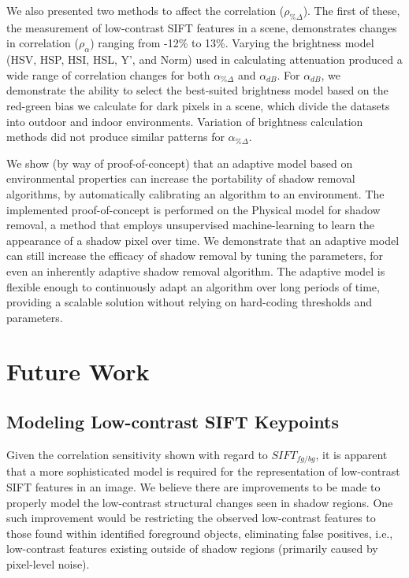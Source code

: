 We also presented two methods to affect the correlation ($\rho_{\%\Delta}$). The first of these, the measurement of low-contrast SIFT features in a scene, demonstrates changes in correlation ($\rho_{\alpha}$) ranging from -12\% to 13\%. Varying the brightness model (HSV, HSP, HSI, HSL, Y', and Norm) used in calculating attenuation produced a wide range of correlation changes for both $\alpha_{\%\Delta}$ and $\alpha_{dB}$. For $\alpha_{dB}$, we demonstrate the ability to select the best-suited brightness model based on the red-green bias we calculate for dark pixels in a scene, which divide the datasets into outdoor and indoor environments. Variation of brightness calculation methods did not produce similar patterns for $\alpha_{\%\Delta}$.

We show (by way of proof-of-concept) that an adaptive model based on environmental properties can increase the portability of shadow removal algorithms, by automatically calibrating an algorithm to an environment. The implemented proof-of-concept is performed on the Physical model for shadow removal, a method that employs unsupervised machine-learning to learn the appearance of a shadow pixel over time. We demonstrate that an adaptive model can still increase the efficacy of shadow removal by tuning the parameters, for even an inherently adaptive shadow removal algorithm. The adaptive model is flexible enough to continuously adapt an algorithm over long periods of time, providing a scalable solution without relying on hard-coding thresholds and parameters. 

\section{Future Work} \label{section:futurework}

\subsection{Modeling Low-contrast SIFT Keypoints}

Given the correlation sensitivity shown with regard to $SIFT_{fg/bg}$, it is apparent that a more sophisticated model is required for the representation of low-contrast SIFT features in an image. We believe there are improvements to be made to properly model the low-contrast structural changes seen in shadow regions. One such improvement would be restricting the observed low-contrast features to those found within identified foreground objects, eliminating false positives, i.e., low-contrast features existing outside of shadow regions (primarily caused by pixel-level noise).

